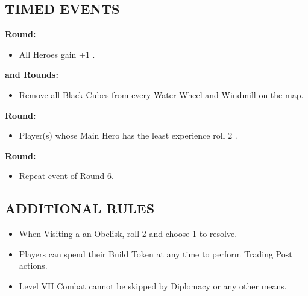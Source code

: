 \begin{multicols}{2}

\subsection*{\MakeUppercase{Timed Events}}

\textbf{ Round:}
\begin{itemize}
  \item All Heroes gain +1 .
\end{itemize}
\textbf{ and  Rounds:}
\begin{itemize}
  \item Remove all Black Cubes from every Water Wheel and Windmill on the map.
\end{itemize}
\textbf{ Round:}
\begin{itemize}
  \item Player(s) whose Main Hero has the least experience roll 2 .
\end{itemize}
\textbf{ Round:}
\begin{itemize}
  \item Repeat event of Round 6.
\end{itemize}

\columnbreak

\subsection*{\MakeUppercase{Additional Rules}}

\begin{itemize}
  \item When Visiting a an Obelisk, roll 2  and choose 1 to resolve.
  \item Players can spend their Build Token at any time to perform Trading Post actions.
  \item Level VII Combat cannot be skipped by Diplomacy or any other means.
\end{itemize}

\vspace*{\fill}

\end{multicols}
